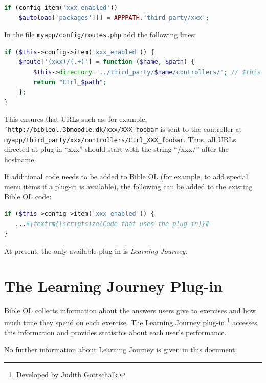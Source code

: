 \documentclass[11pt,oneside,a4paper]{memoir}
\begin{document}
\begin{lstlisting}[language=PHP]
if (config_item('xxx_enabled'))
    $autoload['packages'][] = APPPATH.'third_party/xxx';
\end{lstlisting}

In the file \texttt{myapp/config/routes.php} add the following lines:

\begin{lstlisting}[language=PHP]
if ($this->config->item('xxx_enabled')) {
    $route['(xxx)/(.+)'] = function ($name, $path) {
        $this->directory="../third_party/$name/controllers/"; // $this is the CI_Router object
        return "Ctrl_$path";
    };
}
\end{lstlisting}

This ensures that URLs such as, for example, \texttt{'http://bibleol.3bmoodle.dk/xxx/XXX\_foobar} is
sent to the controller at \texttt{myapp/third\_party/xxx/controllers/Ctrl\_XXX\_foobar}. Thus, all
URLs directed at plug-in ``xxx'' should start with the string ``/xxx/'' after the hostname.

If additional code needs to be added to Bible OL (for example, to add special menu items if a plug-in
is available), the following can be added to the existing Bible OL code:

\begin{lstlisting}[escapechar=\#,language=PHP]
if ($this->config->item('xxx_enabled')) {
   ...#\textrm{\scriptsize(Code that uses the plug-in)}#
}
\end{lstlisting}


At present, the only available plug-in is \emph{Learning Journey}. 

\section{The Learning Journey Plug-in}\label{sec-lj}

Bible OL collects information about the answers users give to exercises and how much time they spend
on each exercise. The Learning Journey plug-in%
\footnote{Developed by Judith Gottschalk.}
accesses this information and provides statistics about each user's
performance.

No further information about Learning Journey is given in this document.




\end{document}
